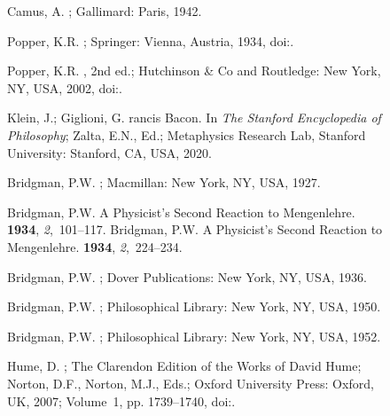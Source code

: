 \documentclass[entropy,article,accept,oneauthor,pdftex]{Definitions/mdpi}
\begin{document}
\begin{figure}[H]
\begin{thebibliography}{999}
Camus, A.
; Gallimard: Paris, 1942.%

Popper, K.R.
; Springer: Vienna, Austria, 1934, doi:{\href{https://doi.org/10.1007/978-3-7091-4177-9}{}}.

Popper, K.R.
, 2nd ed.; Hutchinson \& Co and Routledge: New York, NY, USA, 2002, doi:{\href{https://doi.org/10.4324/9780203994627}{}}.%

Klein, J.; Giglioni, G.
rancis {B}acon. In {\em The {S}tanford Encyclopedia of
  Philosophy};  Zalta, E.N., Ed.; Metaphysics Research Lab, Stanford University: Stanford, CA, USA, 2020.

Bridgman, P.W.
; Macmillan: New York, NY, USA, 1927.

Bridgman, P.W.
\newblock A Physicist's Second Reaction to {M}engenlehre.
 {\bf 1934}, {\em 2},~101--117.%
Bridgman, P.W.
\newblock A Physicist's Second Reaction to {M}engenlehre.
 {\bf 1934}, {\em 2},~224--234.%

Bridgman, P.W.
; Dover Publications: New York, NY, USA, 1936.

Bridgman, P.W.
; Philosophical Library: New York, NY, USA, 1950.

Bridgman, P.W.
; Philosophical Library: New York, NY, USA, 1952.

Hume, D.
; {The Clarendon Edition of the Works of David Hume}; Norton, D.F., Norton, M.J., Eds.; Oxford University Press: Oxford, UK, 2007; Volume~1, pp. 1739--1740, doi:{\href{https://doi.org/10.1093/actrade/9780199596331.book.1}{}}.


\end{thebibliography}
\end{figure}
\end{document}
